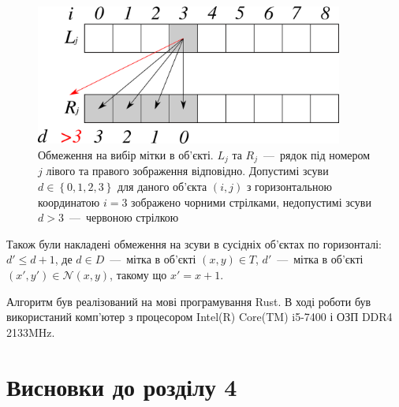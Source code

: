\begin{figure}[h]
  \centering
  \includegraphics[width=0.9\textwidth]{images/disparity_restriction_vertex}
  \caption{Обмеження на вибір мітки в об'єкті.
           $L_j$ та $R_j$~---~рядок під номером $j$
           лівого та правого зображення відповідно.
           Допустимі зсуви $d \in \left\{0, 1, 2, 3 \right\}$
           для даного об'єкта $\left(i, j \right)$
           з горизонтальною координатою $i = 3$
           зображено чорними стрілками,
           недопустимі зсуви $d > 3$~---~червоною стрілкою}
  \label{fig:disparity:restriction:vertex}
\end{figure}

Також були накладені обмеження на зсуви в сусідніх об'єктах по горизонталі:
$d' \le d + 1$, де $d \in D$~---~мітка в об'єкті $\left(x, y \right) \in T$,
$d'$~---~мітка в об'єкті
$\left(x', y' \right) \in \mathcal{N} \left(x, y \right)$,
такому що $x' = x + 1$.



Алгоритм був реалізований на мові програмування Rust.
В ході роботи був використаний комп'ютер з процесором
Intel(R) Core(TM) i5-7400 і ОЗП DDR4 2133MHz.

\section*{Висновки до розділу 4}

